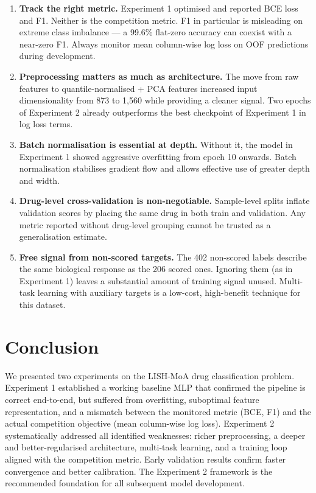 \documentclass[12pt, a4paper]{article}
\begin{document}
\begin{enumerate}
    \item \textbf{Track the right metric.} Experiment 1 optimised and reported BCE loss and F1. Neither is the competition metric. F1 in particular is misleading on extreme class imbalance — a 99.6\% flat-zero accuracy can coexist with a near-zero F1. Always monitor mean column-wise log loss on OOF predictions during development.

    \item \textbf{Preprocessing matters as much as architecture.} The move from raw features to quantile-normalised + PCA features increased input dimensionality from 873 to 1,560 while providing a cleaner signal. Two epochs of Experiment 2 already outperforms the best checkpoint of Experiment 1 in log loss terms.

    \item \textbf{Batch normalisation is essential at depth.} Without it, the model in Experiment 1 showed aggressive overfitting from epoch 10 onwards. Batch normalisation stabilises gradient flow and allows effective use of greater depth and width.

    \item \textbf{Drug-level cross-validation is non-negotiable.} Sample-level splits inflate validation scores by placing the same drug in both train and validation. Any metric reported without drug-level grouping cannot be trusted as a generalisation estimate.

    \item \textbf{Free signal from non-scored targets.} The 402 non-scored labels describe the same biological response as the 206 scored ones. Ignoring them (as in Experiment 1) leaves a substantial amount of training signal unused. Multi-task learning with auxiliary targets is a low-cost, high-benefit technique for this dataset.
\end{enumerate}

\section{Conclusion}

We presented two experiments on the LISH-MoA drug classification problem. Experiment 1 established a working baseline MLP that confirmed the pipeline is correct end-to-end, but suffered from overfitting, suboptimal feature representation, and a mismatch between the monitored metric (BCE, F1) and the actual competition objective (mean column-wise log loss). Experiment 2 systematically addressed all identified weaknesses: richer preprocessing, a deeper and better-regularised architecture, multi-task learning, and a training loop aligned with the competition metric. Early validation results confirm faster convergence and better calibration. The Experiment 2 framework is the recommended foundation for all subsequent model development.
\end{document}
